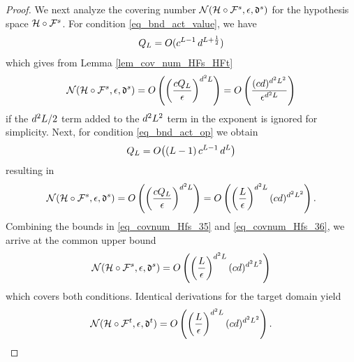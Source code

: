 \documentclass[review,supplement,onefignum,onetabnum]{siamonline250211}
\begin{document}
\begin{proof}
We next analyze the covering number  $\mathcal{N} ( \mathcal{H} \circ \mathcal{F}^s, \epsilon, \mathfrak{d}^s) $ for the hypothesis space $ \mathcal{H} \circ \mathcal{F}^s$. For condition  \eqref{eq_bnd_act_value}, we have
%
\begin{equation*}
\begin{split}
{Q_L} = O( c^{L-1} \, {d}^{L+ \frac{1}{2}})
\end{split}
\end{equation*}
%
which gives from Lemma \ref{lem_cov_num_HFs_HFt}
%
\begin{equation}
\label{eq_covnum_Hfs_35}
\begin{split}
\mathcal{N} ( \mathcal{H} \circ \mathcal{F}^s, \epsilon, \mathfrak{d}^s)  
= O\left( \left(\frac{c {Q_L}}{\epsilon} \right)^{{d}^2 L} \right)
= O\left(  \frac{  (c {d})^{{d}^2 L^2}  }{\epsilon^{{d}^2 L}}  \right)
\end{split}
\end{equation}
%
if the ${d}^2 L/2$ term added to the ${d}^2 L^2$ term in the exponent is ignored for simplicity. Next, for condition \eqref{eq_bnd_act_op} we obtain
%
\begin{equation*}
\begin{split}
{Q_L} = O\big( (L-1) \, c^{L-1} \,  {d}^{L} \big)
\end{split}
\end{equation*}
%
resulting in
%
\begin{equation}
\label{eq_covnum_Hfs_36}
\begin{split}
\mathcal{N} ( \mathcal{H} \circ \mathcal{F}^s, \epsilon, \mathfrak{d}^s) 
= O\left( \left(\frac{c {Q_L}}{\epsilon} \right)^{{d}^2 L} \right)
 = O\left( \left( \frac{  L }{\epsilon}  \right)^{{d}^2 L}   (c {d})^{{d}^2 L^2} \right).
\end{split}
\end{equation}
%
Combining the bounds in \eqref{eq_covnum_Hfs_35} and \eqref{eq_covnum_Hfs_36}, we arrive at the common upper bound
%
\begin{equation*}
\begin{split}
\mathcal{N} ( \mathcal{H} \circ \mathcal{F}^s, \epsilon, \mathfrak{d}^s) 
 = O\left( \left( \frac{  L }{\epsilon}  \right)^{{d}^2 L}   (c {d})^{{d}^2 L^2} \right)
\end{split}
\end{equation*}
%
which covers both conditions. Identical derivations for the target domain yield
%
\begin{equation*}
\begin{split}
\mathcal{N} ( \mathcal{H} \circ \mathcal{F}^t, \epsilon, \mathfrak{d}^t) 
 = O\left( \left( \frac{  L }{\epsilon}  \right)^{{d}^2 L}   (c {d})^{{d}^2 L^2} \right).
\end{split}
\end{equation*}
%

\end{proof}
\end{document}
